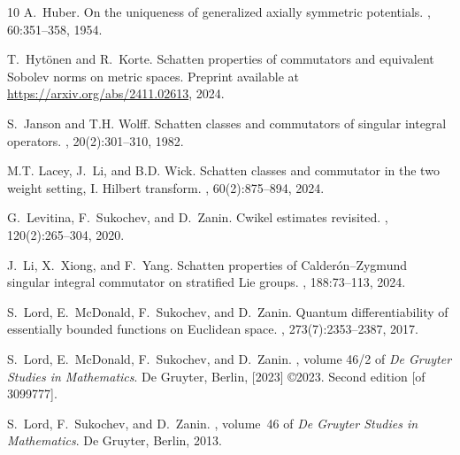 \documentclass[12pt]{amsart}
\begin{document}
\begin{thebibliography}{10}
A.~Huber.
\newblock On the uniqueness of generalized axially symmetric potentials.
, 60:351--358, 1954.

T.~Hyt\"{o}nen and R.~Korte.
\newblock Schatten properties of commutators and equivalent {\color{blue}Sobolev} norms on
  metric spaces.
\newblock Preprint available at \url{https://arxiv.org/abs/2411.02613}, 2024.


S.~Janson and T.H. Wolff.
\newblock Schatten classes and commutators of singular integral operators.
, 20(2):301--310, 1982.

M.T. Lacey, J.~Li, and B.D. Wick.
\newblock Schatten classes and commutator in the two weight setting, {I}.
  {H}ilbert transform.
, 60(2):875--894, 2024.

G.~Levitina, F.~Sukochev, and D.~Zanin.
\newblock Cwikel estimates revisited.
, 120(2):265--304, 2020.

J.~Li, X.~Xiong, and F.~Yang.
\newblock Schatten properties of {C}alder\'{o}n--{Z}ygmund singular integral
  commutator on stratified {L}ie groups.
, 188:73--113, 2024.

S.~Lord, E.~McDonald, F.~Sukochev, and D.~Zanin.
\newblock Quantum differentiability of essentially bounded functions on
  {E}uclidean space.
, 273(7):2353--2387, 2017.

S.~Lord, E.~McDonald, F.~Sukochev, and D.~Zanin.
, volume 46/2 of
  {\em De Gruyter Studies in Mathematics}.
\newblock De Gruyter, Berlin, [2023] \copyright 2023.
\newblock Second edition [of 3099777].

S.~Lord, F.~Sukochev, and D.~Zanin.
, volume~46 of {\em De
  Gruyter Studies in Mathematics}.
\newblock De Gruyter, Berlin, 2013.


\end{thebibliography}
\end{document}
